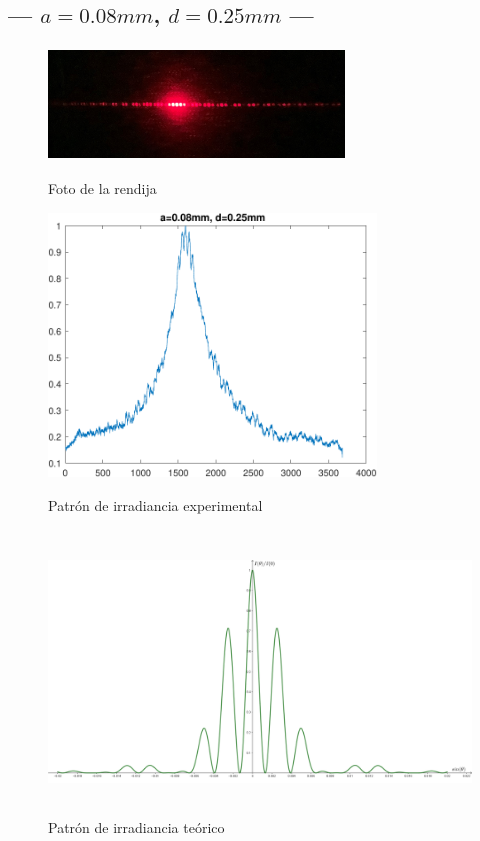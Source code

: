 \documentclass[12pt,a4paper]{article}
\begin{document}
	\newpage
	\subsection{--- \(a=0.08mm\), \(d=0.25mm\) ---} %
	\label{sub:a_alto_d_bajo}
	\begin{figure}[htbp!]
		\centering
		\includegraphics[width=0.7\textwidth, height=3cm]{3_RESUL/08_y_25.jpg}
		\caption{Foto de la rendija}
		\label{fig:A4}
		\includegraphics[width=0.7\linewidth,height=7cm]{3_RESUL/08_y_25.pdf}
		\caption{Patrón de irradiancia experimental}
		\label{fig:A5}
		\includegraphics[width=0.7\linewidth,height=7.5cm]{3_RESUL/Irradiancia 2.png}
		\caption{Patrón de irradiancia teórico}
		\label{fig:A6}
	\end{figure}
\end{document}
